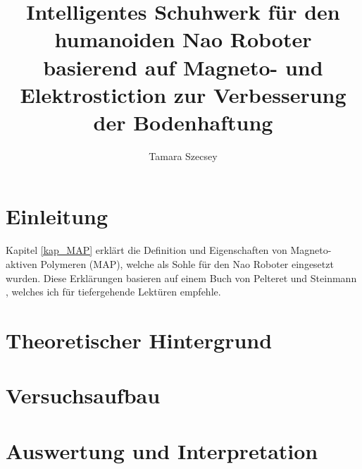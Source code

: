 \documentclass[a4paper,
DIV=13,
12pt,
BCOR=10mm,
department=FakEI,
oneside,
parskip=half,
automark,
]{OTHRartcl}
\title{Intelligentes Schuhwerk für den humanoiden Nao Roboter basierend auf Magneto- und Elektrostiction zur Verbesserung der Bodenhaftung}
\author{Tamara Szecsey}
\begin{document}
\maketitle
\makedeclaration

\thispagestyle{empty}
\tableofcontents	
\clearpage	
\setcounter{page}{1}

\section{Einleitung}
%
Kapitel \ref{kap_MAP} erklärt die Definition und Eigenschaften von Magneto-aktiven Polymeren (MAP), welche als Sohle für den Nao Roboter eingesetzt wurden. Diese Erklärungen basieren auf einem Buch von Pelteret und Steinmann \cite{map2020}, welches ich für tiefergehende Lektüren empfehle. 
\newpage
\section{Theoretischer Hintergrund}

%
\newpage
\section{Versuchsaufbau}

%
%
%
\newpage
\section{Auswertung und Interpretation}

%
%
%
%

\FloatBarrier
\newpage
\clearpage	
\thispagestyle{empty}
\printbibliography
\end{document}
